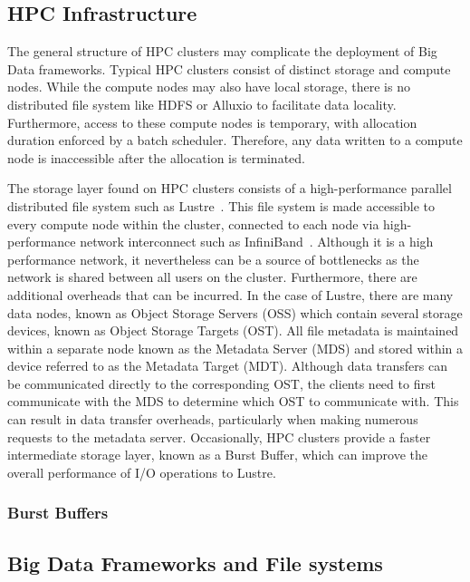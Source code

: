 \subsection{HPC Infrastructure}
      The general structure of HPC clusters may complicate the deployment of Big Data frameworks.
      Typical HPC clusters consist of distinct storage and compute nodes. While the compute
      nodes may also have local storage, there is no distributed file system like HDFS or
      Alluxio to facilitate data locality. Furthermore, access to these compute nodes is
      temporary, with allocation duration enforced by a batch scheduler. Therefore, any
      data written to a compute node is inaccessible after the allocation is terminated.

      The storage layer found on HPC clusters consists of a high-performance parallel
      distributed file system such as Lustre~\cite{lustre}. This file system is made
      accessible to every compute node within the cluster, connected to each node via
      high-performance network interconnect such as InfiniBand~\cite{infiniband}. Although
      it is a high performance network, it nevertheless can be a source of bottlenecks as
      the network is shared between all users on the cluster. Furthermore, there are
      additional overheads that can be incurred. In the case of Lustre,
      there are many data nodes, known as Object Storage Servers (OSS) which contain
      several storage devices, known as Object Storage Targets (OST). All file metadata
      is maintained within a separate node known as the Metadata Server (MDS) and stored within
      a device referred to as the Metadata Target (MDT). Although data transfers can be
      communicated directly to the corresponding OST, the clients need to first communicate
      with the MDS to determine which OST to communicate with. This can result
      in data transfer overheads, particularly when making numerous requests to the metadata server.
      Occasionally, HPC clusters provide a faster intermediate storage layer, known as a Burst Buffer,
      which can improve the overall performance of I/O operations to Lustre.
    
      \subsubsection{Burst Buffers}

\subsection{Big Data Frameworks and File systems}

